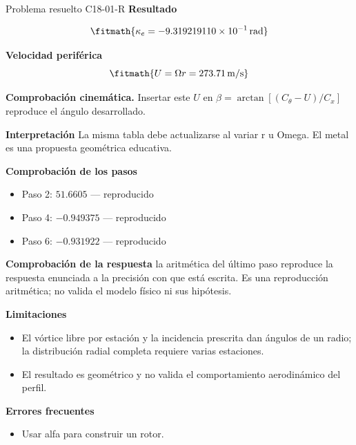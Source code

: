 \documentclass[10pt,openany]{book}
\begin{document}
\begin{studiumworked}{Problema resuelto C18-01-R}
\noindent\textbf{Resultado}

\[
\fitmath{\kappa_e=-9.319219110\times10^{-1}\,\mathrm{rad}}
\]

\noindent\textbf{Velocidad periférica}
\[
\fitmath{U=\Omega r=273.71\,\mathrm{m/s}}
\]

\noindent\textbf{Comprobación cinemática.} Insertar este $U$ en $\beta=\arctan[(C_\theta-U)/C_x]$ reproduce el ángulo desarrollado.

\noindent\textbf{Interpretación}
La misma tabla debe actualizarse al variar r u Omega. El metal es una propuesta geométrica educativa.

\noindent\textbf{Comprobación de los pasos}
\begin{itemize}
\item Paso 2: $51.6605$ — reproducido
\item Paso 4: $-0.949375$ — reproducido
\item Paso 6: $-0.931922$ — reproducido
\end{itemize}

\noindent\textbf{Comprobación de la respuesta} la aritmética del último paso reproduce la respuesta enunciada a la precisión con que está escrita. Es una reproducción aritmética; no valida el modelo físico ni sus hipótesis.

\noindent\textbf{Limitaciones}
\begin{itemize}
\item El vórtice libre por estación y la incidencia prescrita dan ángulos de un radio; la distribución radial completa requiere varias estaciones.
\item El resultado es geométrico y no valida el comportamiento aerodinámico del perfil.
\end{itemize}

\noindent\textbf{Errores frecuentes}
\begin{itemize}
\item Usar alfa para construir un rotor.
\end{itemize}
\end{studiumworked}
\end{document}
